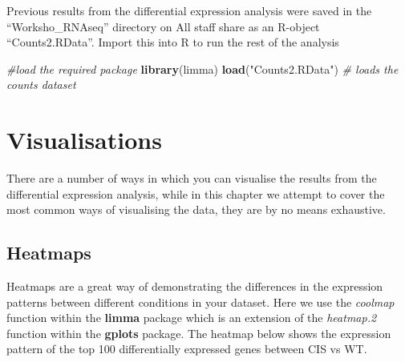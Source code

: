 \documentclass[]{book}
\newenvironment{Shaded}{\begin{snugshade}}{\end{snugshade}}
\newcommand{\CommentTok}[1]{\textcolor[rgb]{0.56,0.35,0.01}{\textit{#1}}}
\newcommand{\DataTypeTok}[1]{\textcolor[rgb]{0.13,0.29,0.53}{#1}}
\newcommand{\DecValTok}[1]{\textcolor[rgb]{0.00,0.00,0.81}{#1}}
\newcommand{\FloatTok}[1]{\textcolor[rgb]{0.00,0.00,0.81}{#1}}
\newcommand{\KeywordTok}[1]{\textcolor[rgb]{0.13,0.29,0.53}{\textbf{#1}}}
\newcommand{\NormalTok}[1]{#1}
\newcommand{\OperatorTok}[1]{\textcolor[rgb]{0.81,0.36,0.00}{\textbf{#1}}}
\newcommand{\StringTok}[1]{\textcolor[rgb]{0.31,0.60,0.02}{#1}}
\begin{document}
Previous results from the differential expression analysis were saved in the ``Worksho\_RNAseq'' directory on All staff share as an R-object ``Counts2.RData''. Import this into R to run the rest of the analysis

\begin{Shaded}
\begin{Highlighting}[]
\CommentTok{#load the required package}
\KeywordTok{library}\NormalTok{(limma)}
\KeywordTok{load}\NormalTok{(}\StringTok{"Counts2.RData"}\NormalTok{) }\CommentTok{# loads the counts dataset}
\end{Highlighting}
\end{Shaded}

\hypertarget{visualisations}{%
\section{Visualisations}\label{visualisations}}

There are a number of ways in which you can visualise the results from the differential expression analysis, while in this chapter we attempt to cover the most common ways of visualising the data, they are by no means exhaustive.

\hypertarget{heatmaps}{%
\subsection{Heatmaps}\label{heatmaps}}

Heatmaps are a great way of demonstrating the differences in the expression patterns between different conditions in your dataset. Here we use the \emph{coolmap} function within the \textbf{limma} package which is an extension of the \emph{heatmap.2} function within the \textbf{gplots} package. The heatmap below shows the expression pattern of the top 100 differentially expressed genes between CIS vs WT.

\begin{Shaded}
\end{Shaded}
\end{document}
